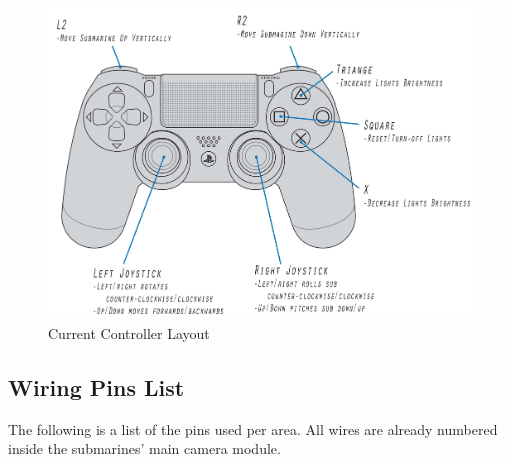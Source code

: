 \documentclass[
18pt, %
a4paper, %
oneside, %
headinclude,footinclude, %
]{scrartcl}
\begin{document}
\begin{figure}[H]
	\centering 
	\hspace*{-2.5cm}
	\includegraphics[width=1.4\columnwidth]{Figures/Component_Diagrams/dualshock_4_Layout.jpg}
	\caption[]{Current Controller Layout} %
\end{figure}

\clearpage
\newpage

\subsection{Wiring Pins List}

The following is a list of the pins used per area. All wires are already numbered inside the submarines' main camera module. 
\end{document}
